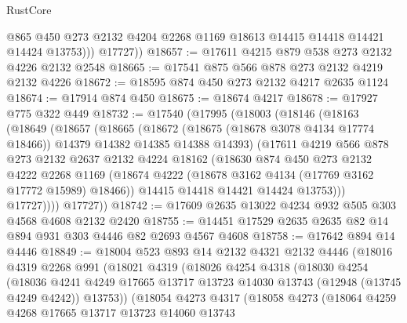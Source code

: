 \begin{lexlean}{RustCore}
\begin{coremodule}
              @865
              @450
              @273
              @2132
              @4204
              @2268
              @1169
              @18613
              @14415
              @14418
              @14421
              @14424
              @13753)))
        @17727))
@18657 := @17611 @4215 @879 @538 @273 @2132 @4226 @2132 @2548
@18665 := @17541 @875 @566 @878 @273 @2132 @4219 @2132 @4226
@18672 := @18595 @874 @450 @273 @2132 @4217 @2635 @1124
@18674 := @17914 @874 @450
@18675 := @18674 @4217
@18678 := @17927 @775 @322 @449
@18732 := @17540
    (@17995
      (@18003
        (@18146
          (@18163
            (@18649
              (@18657
                (@18665
                  (@18672
                    (@18675 (@18678 @3078 @4134 @17774 @18466))
                    @14379
                    @14382
                    @14385
                    @14388
                    @14393)
                  (@17611
                    @4219
                    @566
                    @878
                    @273
                    @2132
                    @2637
                    @2132
                    @4224
                    @18162
                    (@18630
                      @874
                      @450
                      @273
                      @2132
                      @4222
                      @2268
                      @1169
                      (@18674 @4222 (@18678 @3162 @4134 (@17769 @3162 @17772 @15989) @18466))
                      @14415
                      @14418
                      @14421
                      @14424
                      @13753)))
                @17727))))
        @17727))
@18742 := @17609 @2635 @13022 @4234 @932 @505 @303 @4568 @4608 @2132 @2420
@18755 := @14451 @17529 @2635 @2635 @82 @14 @894 @931 @303 @4446 @82 @2693 @4567 @4608
@18758 := @17642 @894 @14 @4446
@18849 := @18004
    @523
    @893
    @14
    @2132
    @4321
    @2132
    @4446
    (@18016
      @4319
      @2268
      @991
      (@18021
        @4319
        (@18026
          @4254
          @4318
          (@18030
            @4254
            (@18036
              @4241
              @4249
              @17665
              @13717
              @13723
              @14030
              @13743
              (@12948 (@13745 @4249 @4242))
              @13753))
          (@18054
            @4273
            @4317
            (@18058
              @4273
              (@18064
                @4259
                @4268
                @17665
                @13717
                @13723
                @14060
                @13743

\end{coremodule}
\end{lexlean}
